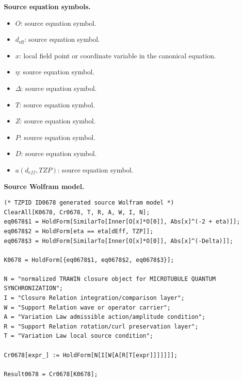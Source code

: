 \begin{minipage}[t]{0.49\linewidth}
\begingroup
\small
\raggedright
\textbf{Source equation symbols.}\par
\begin{itemize}[leftmargin=1.35em,itemsep=1pt,topsep=1pt,parsep=0pt]
    \item $O$: source equation symbol.
    \item $d_{\mathrm{eff}}$: source equation symbol.
    \item $x$: local field point or coordinate variable in the canonical equation.
    \item $\eta$: source equation symbol.
    \item $\Delta$: source equation symbol.
    \item $T$: source equation symbol.
    \item $Z$: source equation symbol.
    \item $P$: source equation symbol.
    \item $D$: source equation symbol.
    \item $a(d_{eff},TZP)$: source equation symbol.
\end{itemize}
\endgroup
\end{minipage}\hfill
\begin{minipage}[t]{0.47\linewidth}
\begingroup
\scriptsize
\raggedright
\textbf{Source Wolfram model.}\par
\begin{Verbatim}[fontsize=\tiny,breaklines=true,breakanywhere=true]
(* TZPID ID0678 generated source Wolfram model *)
ClearAll[K0678, Cr0678, T, R, A, W, I, N];
eq0678$1 = HoldForm[SimilarTo[Inner[O[x]*O[0]], Abs[x]^(-2 + eta)]];
eq0678$2 = HoldForm[eta == eta[dEff, TZP]];
eq0678$3 = HoldForm[SimilarTo[Inner[O[x]*O[0]], Abs[x]^(-Delta)]];

K0678 = HoldForm[{eq0678$1, eq0678$2, eq0678$3}];

N = "normalized TRAWIN closure object for MICROTUBULE QUANTUM SYNCHRONIZATION";
I = "Closure Relation integration/comparison layer";
W = "Support Relation wave or operator carrier";
A = "Variation Law admissible action/amplitude condition";
R = "Support Relation rotation/curl preservation layer";
T = "Variation Law local source condition";

Cr0678[expr_] := HoldForm[N[I[W[A[R[T[expr]]]]]]];

Result0678 = Cr0678[K0678];
\end{Verbatim}
\endgroup
\end{minipage}

